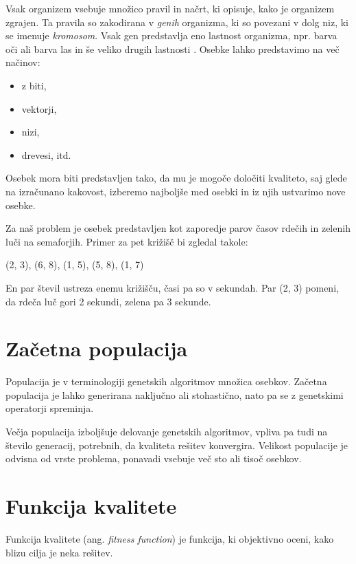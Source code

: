 \documentclass[a4paper, 12pt]{book}
\begin{document}
Vsak organizem vsebuje mno\v zico pravil in na\v crt, ki opisuje, kako je organizem zgrajen. Ta pravila so zakodirana v \textit{genih} organizma, ki so povezani v dolg niz, ki se imenuje \textit{kromosom}. Vsak gen predstavlja eno lastnost organizma, npr. barva o\v ci ali barva las in \v se veliko drugih lastnosti
\cite{aijunkie}. Osebke lahko predstavimo na ve\v c na\v cinov:

\begin{itemize} \itemsep0em
\item z biti,
\item vektorji,
\item nizi,
\item drevesi, itd.
\end{itemize}

Osebek mora biti predstavljen tako, da mu je mogo\v ce dolo\v citi kvaliteto, saj glede na izra\v cunano kakovost, izberemo najbolj\v se med osebki in iz njih ustvarimo nove osebke.

Za na\v s problem je osebek predstavljen kot zaporedje parov \v casov rde\v cih in zelenih lu\v ci na semaforjih. Primer za pet kri\v zi\v s\v c bi zgledal takole:
\begin{center}
(2, 3), (6, 8), (1, 5), (5, 8), (1, 7)
\end{center}

En par \v stevil ustreza enemu kri\v zi\v s\v cu, \v casi pa so v sekundah. Par (2, 3) pomeni, da rde\v ca lu\v c gori 2 sekundi, zelena pa 3 sekunde.

\section{Za\v cetna populacija}
Populacija je v terminologiji genetskih algoritmov mno\v zica osebkov. Za\v cetna populacija je lahko generirana naklju\v cno ali stohasti\v cno, nato pa se z genetskimi operatorji spreminja.

Ve\v cja populacija izbolj\v suje delovanje genetskih algoritmov, vpliva pa tudi na \v stevilo generacij, potrebnih, da kvaliteta re\v sitev konvergira. Velikost populacije je odvisna od vrste problema, ponavadi vsebuje ve\v c sto ali tiso\v c osebkov.

\section{Funkcija kvalitete}
Funkcija kvalitete (ang. \textit{fitness function}) je funkcija, ki objektivno oceni, kako blizu cilja je neka re\v sitev.
\end{document}
